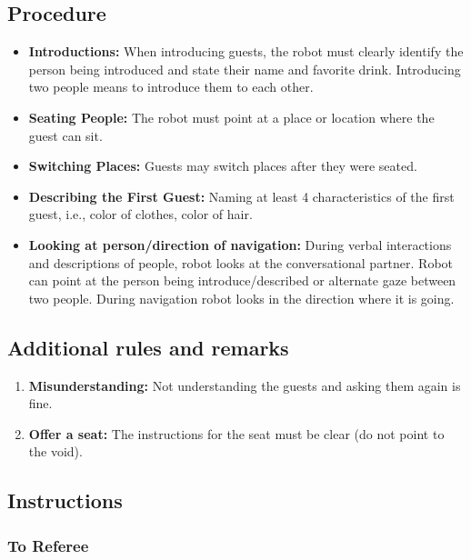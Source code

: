\subsection*{Procedure}
\begin{itemize}
    \item \textbf{Introductions:} When introducing guests, the robot must clearly identify the person being introduced and state their name and favorite drink. Introducing two people means to introduce them to each other.
	
	\item \textbf{Seating People:} The robot must point at a place or location where the guest can sit.
	
	\item \textbf{Switching Places:} Guests may switch places after they were seated.
	
	\item \textbf{Describing the First Guest:} Naming at least 4 characteristics of the first guest, i.e., color of clothes, color of hair.
	\item \textbf{Looking at person/direction of navigation:} During verbal interactions and descriptions of people, robot looks at the conversational partner. Robot can point at the person being introduce/described or alternate gaze between two people. During navigation robot looks in the direction where it is going.  
\end{itemize}

\subsection*{Additional rules and remarks}
\begin{enumerate}[nosep]
	\item \textbf{Misunderstanding:} Not understanding the guests and asking them again is fine.
	\item \textbf{Offer a seat:} The instructions for the seat must be clear (do not point to the void).
			
\end{enumerate}


\subsection*{Instructions}

\subsubsection*{To Referee}

